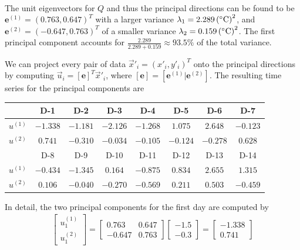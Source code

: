 \begin{solution}
\begin{align*}
\end{align*}
The unit eigenvectors for $Q$ and thus the principal directions can be found to be $\textbf{e}^{(1)} = (0.763, 0.647)^T$ with a larger variance $\lambda_1 = \SI{2.289}{\square {(\degree C)}}$, and $\textbf{e}^{(2)} = (-0.647, 0.763)^T$ of a smaller variance $\lambda_2 = \SI{0.159}{\square {(\degree C)}}$. The first principal component accounts for $\frac{2.289}{2.289+0.159} \approx 93.5\%$ of the total variance.\par
We can project every pair of data $\vec{x}'_i = (x'_i, y'_i)^T$ onto the principal directions by computing $\vec{u}_i = [\textbf{e}]^T\vec{x}'_i$, where $[\textbf{e}] = [\textbf{e}^{(1)}|\textbf{e}^{(2)}]$. The resulting time series for the principal components are 
\begin{center}
\begin{tabular}{|c|c|c|c|c|c|c|c|}
\hline
 & D-1 & D-2 & D-3 & D-4 & D-5 & D-6 & D-7 \\
\hline
$u^{(1)}$ & $-1.338$ & $-1.181$ & $-2.126$ & $-1.268$ & $1.075$ & $2.648$ & $-0.123$ \\
\hline
$u^{(2)}$ & $0.741$ & $-0.310$ & $-0.034$ & $-0.105$ & $-0.124$ & $-0.278$ & $0.628$ \\
\hline
 & D-8 & D-9 & D-10 & D-11 & D-12 & D-13 & D-14 \\
\hline
$u^{(1)}$ & $-0.434$ & $-1.345$ & $0.164$ & $-0.875$ & $0.834$ & $2.655$ & $1.315$ \\
\hline
$u^{(2)}$ & $0.106$ & $-0.040$ & $-0.270$ & $-0.569$ & $0.211$ & $0.503$ & $-0.459$ \\
\hline
\end{tabular}
\end{center}
In detail, the two principal components for the first day are computed by
\begin{align*}
\begin{bmatrix}
u_1^{(1)} \\
u_1^{(2)} 
\end{bmatrix}
=
\begin{bmatrix}
0.763 & 0.647 \\
-0.647 & 0.763
\end{bmatrix}
\begin{bmatrix}
-1.5 \\
-0.3
\end{bmatrix}
=
\begin{bmatrix}
-1.338\\
0.741
\end{bmatrix}
\end{align*}

\end{solution}
